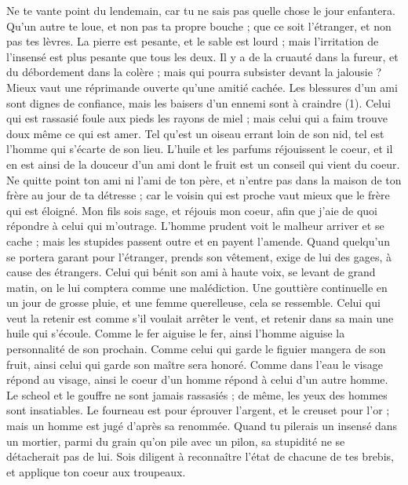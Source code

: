 \begin{multicols}{2}
\VerseOne{}Ne te vante point du lendemain, car tu ne sais pas quelle chose le jour enfantera.
Qu'un autre te loue, et non pas ta propre bouche ; que ce soit l'étranger, et non pas tes lèvres.
La pierre est pesante, et le sable est lourd ; mais l’irritation de l’insensé est plus pesante que tous les deux.
Il y a de la cruauté dans la fureur, et du débordement dans la colère ; mais qui pourra subsister devant la jalousie ?
Mieux vaut une réprimande ouverte qu'une amitié cachée.
Les blessures d’un ami sont dignes de confiance, mais les baisers d’un ennemi sont à craindre (1).
Celui qui est rassasié foule aux pieds les rayons de miel ; mais celui qui a faim trouve doux même ce qui est amer.
Tel qu'est un oiseau errant loin de son nid, tel est l'homme qui s'écarte de son lieu.
L'huile et les parfums réjouissent le coeur, et il en est ainsi de la douceur d'un ami dont le fruit est un conseil qui vient du coeur.
Ne quitte point ton ami ni l'ami de ton père, et n'entre pas dans la maison de ton frère au jour de ta détresse ; car le voisin qui est proche vaut mieux que le frère qui est éloigné.
Mon fils sois sage, et réjouis mon coeur, afin que j'aie de quoi répondre à celui qui m’outrage.
L'homme prudent voit le malheur arriver et se cache ; mais les stupides passent outre et en payent l'amende.
Quand quelqu'un se portera garant pour l'étranger, prends son vêtement, exige de lui des gages, à cause des étrangers.
Celui qui bénit son ami à haute voix, se levant de grand matin, on le lui comptera comme une malédiction.
Une gouttière continuelle en un jour de grosse pluie, et une femme querelleuse, cela se ressemble.
Celui qui veut la retenir est comme s’il voulait arrêter le vent, et retenir dans sa main une huile qui s’écoule.
Comme le fer aiguise le fer, ainsi l'homme aiguise la personnalité de son prochain.
Comme celui qui garde le figuier  mangera de son fruit, ainsi celui qui garde son maître sera honoré.
Comme dans l'eau le visage répond au visage, ainsi le coeur d'un homme répond à celui d'un autre homme.
Le scheol et le gouffre ne sont jamais rassasiés ; de même, les yeux des hommes sont insatiables.
Le fourneau est pour éprouver l'argent, et le creuset pour l'or ; mais un homme est jugé d’après sa renommée.
Quand tu pilerais un insensé dans un mortier, parmi du grain qu'on pile avec un pilon, sa stupidité ne se détacherait pas de lui.
Sois diligent à reconnaître l'état de chacune de tes brebis, et applique ton coeur aux troupeaux.

\end{multicols}
